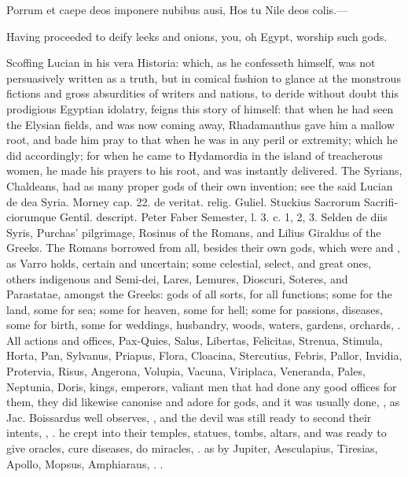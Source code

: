{\begin{latin}%
\begin{displayquote}%
Porrum et caepe deos imponere nubibus ausi,
Hos tu Nile deos colis.---
\end{displayquote}%
\end{latin}%
\translationrule%
\begin{displayquote}%
Having proceeded to deify leeks and onions, you, oh Egypt, worship such gods.
\end{displayquote}%

Scoffing Lucian in his \textlatin{vera Historia}: which, as he confesseth
himself, was not persuasively written as a truth, but in comical
fashion to glance at the monstrous fictions and gross absurdities of
writers and nations, to deride without doubt this prodigious Egyptian
idolatry, feigns this story of himself: that when he had seen the
Elysian fields, and was now coming away, Rhadamanthus gave him a mallow
root, and bade him pray to that when he was in any peril or extremity;
which he did accordingly; for when he came to Hydamordia in the island
of treacherous women, he made his prayers to his root, and was
instantly delivered. The Syrians, Chaldeans, had as many proper gods of
their own invention; see the said Lucian \textlatin{de dea Syria}. Morney \textlatin{cap. 22.
de veritat. relig.} Guliel. Stuckius \textlatin{Sacrorum Sacrificiorumque
Gentil. descript.} Peter Faber Semester, \textlatin{l. 3. c. 1, 2, 3.} Selden \textlatin{de
diis Syris}, Purchas' pilgrimage,  Rosinus of the Romans, and
Lilius Giraldus of the Greeks. The Romans borrowed from all, besides
their own gods, which were  and , as Varro holds,
certain and uncertain; some celestial, select, and great ones, others
indigenous and Semi-dei, Lares, Lemures, Dioscuri, Soteres, and
Parastatae,  amongst the Greeks: gods of all sorts, for
all functions; some for the land, some for sea; some for heaven, some
for hell; some for passions, diseases, some for birth, some for
weddings, husbandry, woods, waters, gardens, orchards, \etc{}. All actions
and offices, Pax-Quies, Salus, Libertas, Felicitas, Strenua, Stimula,
Horta, Pan, Sylvanus, Priapus, Flora, Cloacina, Stercutius, Febris,
Pallor, Invidia, Protervia, Risus, Angerona, Volupia, Vacuna,
Viriplaca, Veneranda, Pales, Neptunia, Doris, kings, emperors, valiant
men that had done any good offices for them, they did likewise canonise
and adore for gods, and it was usually done, , as
Jac. Boissardus well observes, , and the devil was still ready to second their
intents, ,
\etc{}. he crept into their temples, statues, tombs, altars, and was ready
to give oracles, cure diseases, do miracles, \etc{}. as by Jupiter,
Aesculapius, Tiresias, Apollo, Mopsus, Amphiaraus, \etc{}. .

}
